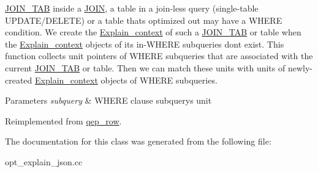 \mbox{\hyperlink{classJOIN__TAB}{J\+O\+I\+N\+\_\+\+T\+AB}} inside a \mbox{\hyperlink{classJOIN}{J\+O\+IN}}, a table in a join-\/less query (single-\/table U\+P\+D\+A\+T\+E/\+D\+E\+L\+E\+TE) or a table that\textquotesingle{}s optimized out may have a W\+H\+E\+RE condition. We create the \mbox{\hyperlink{structExplain__context}{Explain\+\_\+context}} of such a \mbox{\hyperlink{classJOIN__TAB}{J\+O\+I\+N\+\_\+\+T\+AB}} or table when the \mbox{\hyperlink{structExplain__context}{Explain\+\_\+context}} objects of its in-\/W\+H\+E\+RE subqueries don\textquotesingle{}t exist. This function collects unit pointers of W\+H\+E\+RE subqueries that are associated with the current \mbox{\hyperlink{classJOIN__TAB}{J\+O\+I\+N\+\_\+\+T\+AB}} or table. Then we can match these units with units of newly-\/created \mbox{\hyperlink{structExplain__context}{Explain\+\_\+context}} objects of W\+H\+E\+RE subqueries.


\begin{DoxyParams}{Parameters}
{\em subquery} & W\+H\+E\+RE clause subquery\textquotesingle{}s unit \\
\hline
\end{DoxyParams}


Reimplemented from \mbox{\hyperlink{classqep__row_ad5453e115753d93ac2abf2cabcb8ea03}{qep\+\_\+row}}.



The documentation for this class was generated from the following file\+:\begin{DoxyCompactItemize}
\item 
opt\+\_\+explain\+\_\+json.\+cc\end{DoxyCompactItemize}

